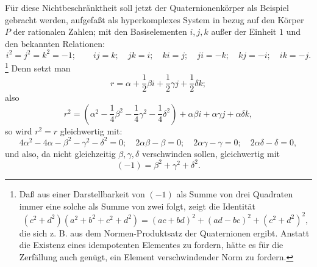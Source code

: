 Für diese Nichtbeschränktheit soll jetzt der Quaternionenkörper als Beispiel gebracht werden, aufgefaßt als hyperkomplexes System in bezug auf den Körper $P$ der rationalen Zahlen; mit den Basiselementen $i,j,k$ außer der Einheit $1$ und den bekannten Relationen:
\[
 i^2=j^2=k^2=-1;\qquad ij=k;\quad jk=i;\quad ki=j;\quad ji=-k;\quad kj=-i;\quad ik=-j.
\]
\footnote{Daß aus einer Darstellbarkeit von $(-1)$ als Summe von drei Quadraten immer eine solche als Summe von zwei folgt, zeigt die Identität
\[
(c^2+d^2)(a^2+b^2+c^2+d^2)=(ac+bd)^2+(ad-bc)^2+(c^2+d^2)^2,
\]
die sich z. B. aus dem Normen-Produktsatz der Quaternionen ergibt. Anstatt die Existenz eines idempotenten Elementes zu fordern, hätte es für die Zerfällung auch genügt, ein Element verschwindender Norm zu fordern.} Denn setzt man
\[
        r=\alpha+\frac12\beta i+\frac12\gamma j+\frac12\delta k;
\]
also
\[
        r^2=\left(\alpha^2-\frac14\beta^2-\frac14\gamma^2-\frac14\delta^2\right)
          +\alpha\beta i+\alpha\gamma j+\alpha\delta k,
\]
so wird $r^2=r$ gleichwertig mit:
\[
4\alpha^2-4\alpha-\beta^2-\gamma^2-\delta^2=0;\quad
2\alpha\beta-\beta=0;\quad 2\alpha\gamma-\gamma=0;\quad 2\alpha\delta-\delta=0,
\]
und also, da nicht gleichzeitig $\beta,\gamma,\delta$ verschwinden sollen, gleichwertig mit
\[
        (-1)=\beta^2+\gamma^2+\delta^2.
\]

